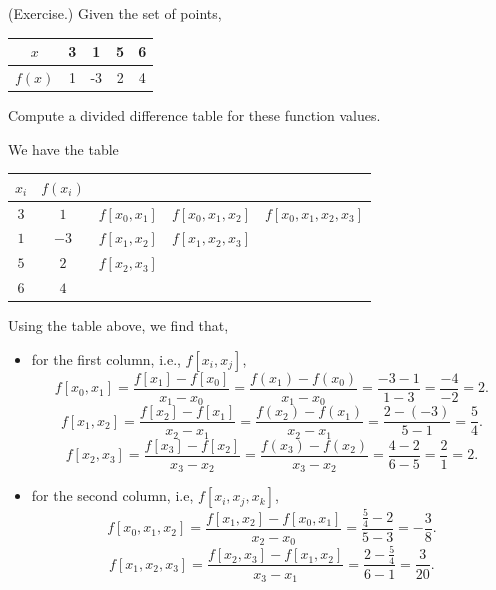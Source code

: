 \documentclass[letterpaper]{article}
\begin{document}
\begin{mdframed}
    (Exercise.) Given the set of points, 
    \begin{center}
        \begin{tabular}{c||c c c c}
            $x$ & 3 & 1 & 5 & 6 \\ 
            \hline 
            $f(x)$ & 1 & -3 & 2 & 4
        \end{tabular}
    \end{center}
    Compute a divided difference table for these function values.

    \begin{mdframed}
        We have the table 
        \begin{center}
            \begin{tabular}{c||c c c c}
                $x_i$ & $f(x_i)$ &   &    &    \\ 
                \hline 
                $3$ & $1$ & $f[x_0, x_1]$ & $f[x_0, x_1, x_2]$ & $f[x_0, x_1, x_2, x_3]$ \\ 
                $1$ & $-3$ & $f[x_1, x_2]$ & $f[x_1, x_2, x_3]$ & \\ 
                $5$ & $2$ & $f[x_2, x_3]$ &                    & \\ 
                $6$ & $4$ &    
            \end{tabular}
        \end{center}
        Using the table above, we find that, 
        \begin{itemize}
            \item for the first column, i.e., $f[x_i, x_j]$, 
            \[f[x_0, x_1] = \frac{f[x_1] - f[x_0]}{x_1 - x_0} = \frac{f(x_1) - f(x_0)}{x_1 - x_0} = \frac{-3 - 1}{1 - 3} = \frac{-4}{-2} = 2.\]
            \[f[x_1, x_2] = \frac{f[x_2] - f[x_1]}{x_2 - x_1} = \frac{f(x_2) - f(x_1)}{x_2 - x_1} = \frac{2 - (-3)}{5 - 1} = \frac{5}{4}.\]
            \[f[x_2, x_3] = \frac{f[x_3] - f[x_2]}{x_3 - x_2} = \frac{f(x_3) - f(x_2)}{x_3 - x_2} = \frac{4 - 2}{6 - 5} = \frac{2}{1} = 2.\]

            \item for the second column, i.e, $f[x_i, x_j, x_k]$, 
            \[f[x_0, x_1, x_2] = \frac{f[x_1, x_2] - f[x_0, x_1]}{x_2 - x_0} = \frac{\frac{5}{4} - 2}{5 - 3} = -\frac{3}{8}.\]
            \[f[x_1, x_2, x_3] = \frac{f[x_2, x_3] - f[x_1, x_2]}{x_3 - x_1} = \frac{2 - \frac{5}{4}}{6 - 1} = \frac{3}{20}.\]


\end{itemize}
\end{mdframed}
\end{mdframed}
\end{document}
